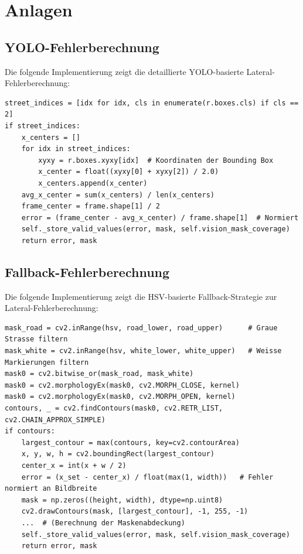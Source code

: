 
\section{Anlagen}\label{chap:anlagen}

\subsection{YOLO-Fehlerberechnung}

Die folgende Implementierung zeigt die detaillierte YOLO-basierte Lateral-Fehlerberechnung:

\begin{lstlisting}[style=python,caption={YOLO-Fehlerberechnung - Implementierung},label={lst:yolo_error_calculation_appendix}]
street_indices = [idx for idx, cls in enumerate(r.boxes.cls) if cls == 2]
if street_indices:
    x_centers = []
    for idx in street_indices:
        xyxy = r.boxes.xyxy[idx]  # Koordinaten der Bounding Box
        x_center = float((xyxy[0] + xyxy[2]) / 2.0)
        x_centers.append(x_center)
    avg_x_center = sum(x_centers) / len(x_centers)
    frame_center = frame.shape[1] / 2
    error = (frame_center - avg_x_center) / frame.shape[1]  # Normiert
    self._store_valid_values(error, mask, self.vision_mask_coverage)
    return error, mask
\end{lstlisting}

\subsection{Fallback-Fehlerberechnung}

Die folgende Implementierung zeigt die HSV-basierte Fallback-Strategie zur Lateral-Fehlerberechnung:

\begin{lstlisting}[style=python,caption={Fallback-Fehlerberechnung - Implementierung},label={lst:fallback_error_calculation_appendix}]
mask_road = cv2.inRange(hsv, road_lower, road_upper)      # Graue Strasse filtern
mask_white = cv2.inRange(hsv, white_lower, white_upper)   # Weisse Markierungen filtern
mask0 = cv2.bitwise_or(mask_road, mask_white)
mask0 = cv2.morphologyEx(mask0, cv2.MORPH_CLOSE, kernel)
mask0 = cv2.morphologyEx(mask0, cv2.MORPH_OPEN, kernel)
contours, _ = cv2.findContours(mask0, cv2.RETR_LIST, cv2.CHAIN_APPROX_SIMPLE)
if contours:
    largest_contour = max(contours, key=cv2.contourArea)
    x, y, w, h = cv2.boundingRect(largest_contour)
    center_x = int(x + w / 2)
    error = (x_set - center_x) / float(max(1, width))   # Fehler normiert an Bildbreite
    mask = np.zeros((height, width), dtype=np.uint8)
    cv2.drawContours(mask, [largest_contour], -1, 255, -1)
    ...  # (Berechnung der Maskenabdeckung)
    self._store_valid_values(error, mask, self.vision_mask_coverage)
    return error, mask
\end{lstlisting}

